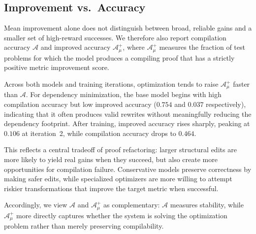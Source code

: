 \subsection{Improvement vs.\ Accuracy}
\label{sec:imp2_acc}

Mean improvement alone does not distinguish between broad, reliable gains and a smaller set of high-reward successes. We therefore also report compilation accuracy $\mathcal{A}$ and improved accuracy $\mathcal{A}_\mu^+$, where $\mathcal{A}_\mu^+$ measures the fraction of test problems for which the model produces a compiling proof that has a strictly positive metric improvement score.

Across both models and training iterations, optimization tends to raise $\mathcal{A}_\mu^+$ faster than $\mathcal{A}$. For dependency minimization, the base model begins with high compilation accuracy but low improved accuracy ($0.754$ and $0.037$ respectively), indicating that it often produces valid rewrites without meaningfully reducing the dependency footprint. After training, improved accuracy rises sharply, peaking at $0.106$ at iteration~2, while compilation accuracy drops to $0.464$.

This reflects a central tradeoff of proof refactoring: larger structural edits are more likely to yield real gains when they succeed, but also create more opportunities for compilation failure. Conservative models preserve correctness by making safer edits, while specialized optimizers are more willing to attempt riskier transformations that improve the target metric when successful.

Accordingly, we view $\mathcal{A}$ and $\mathcal{A}_\mu^+$ as complementary: $\mathcal{A}$ measures stability, while $\mathcal{A}_\mu^+$ more directly captures whether the system is solving the optimization problem rather than merely preserving compilability.

